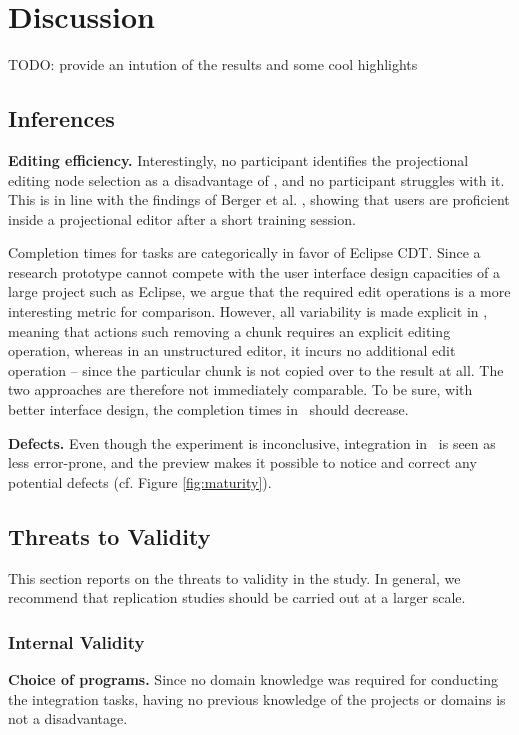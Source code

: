 \chapter{Discussion}
TODO: provide an intution of the results and some cool highlights

\section{Inferences}
\textbf{Editing efficiency.} Interestingly, no participant identifies the projectional editing node selection as a disadvantage of \tooln, and no participant struggles with it. This is in line with the findings of Berger et al. \cite{berger2016mps}, showing that users are proficient inside a projectional editor after a short training session.

Completion times for tasks are categorically in favor of Eclipse CDT. Since a research prototype cannot compete with the user interface design capacities of a large project such as Eclipse, we argue that the required edit operations is a more interesting metric for comparison. However, all variability is made explicit in \tooln, meaning that actions such removing a chunk requires an explicit editing operation, whereas in an unstructured editor, it incurs no additional edit operation -- since the particular chunk is not copied over to the result at all. The two approaches are therefore not immediately comparable. To be sure, with better interface design, the completion times in \tooln~should decrease.

\textbf{Defects.} Even though the experiment is inconclusive, integration in \tooln~is seen as less error-prone, and the preview makes it possible to notice and correct any potential defects (cf. Figure \ref{fig:maturity}).



\section{Threats to Validity}
This section reports on the threats to validity in the study. In general, we recommend that replication studies should be carried out at a larger scale. 

\subsection{Internal Validity}
\textbf{Choice of programs.} 
Since no domain knowledge was required for conducting the integration tasks, having no previous knowledge of the projects or domains is not a disadvantage.

